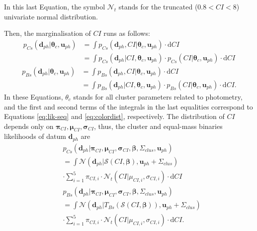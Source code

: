 In this last Equation, the symbol $\mathcal{N}_t$ stands for the truncated ($0.8<CI<8$) univariate normal distribution.

Then, the marginalisation of $CI$ runs as follows:
\begin{align}
\label{eq:clmarginalps}
 p_{Cs}(\mathbf{d}_{ph}| \boldsymbol{\theta}_c,\mathbf{u}_{ph})&=\int p_{Cs}(\mathbf{d}_{ph},CI| \boldsymbol{\theta}_c,\mathbf{u}_{ph}) \cdot \mathrm{d}CI \nonumber \\
 &=\int p_{Cs}(\mathbf{d}_{ph}|CI, \boldsymbol{\theta}_c,\mathbf{u}_{ph}) \cdot p_{Cs}(CI| \boldsymbol{\theta}_c,\mathbf{u}_{ph})\cdot \mathrm{d}CI 
\end{align}
\begin{align}
\label{eq:clmarginalpb}
p_{Bs}(\mathbf{d}_{ph}| \boldsymbol{\theta}_c,\mathbf{u}_{ph})&=\int p_{Bs}(\mathbf{d}_{ph},CI| \boldsymbol{\theta}_c,\mathbf{u}_{ph})\cdot \mathrm{d}CI \nonumber \\
 &=\int p_{Bs}(\mathbf{d}_{ph}|CI, \boldsymbol{\theta}_c,\mathbf{u}_{ph})\cdot p_{Bs}(CI| \boldsymbol{\theta}_c,\mathbf{u}_{ph})\cdot \mathrm{d}CI.
\end{align}
In these Equations, $\theta_c$ stands for all cluster parameters related to photometry, and the first and second terms of the integrals in the last equalities correspond to Equations \ref{eq:lik-seq} and \ref{eq:colordist}, respectively. The distribution of $CI$ depends only on $\boldsymbol{\pi}_{CI},\boldsymbol{\mu}_{CI},\boldsymbol{\sigma}_{CI}$, thus, the cluster and equal-mass binaries likelihoods of datum $\mathbf{d}_{ph}$ are 
\begin{align}
\label{eq:lik-seq2}
 &p_{Cs}(\mathbf{d}_{ph}|\boldsymbol{\pi}_{CI},\boldsymbol{\mu}_{CI},\boldsymbol{\sigma}_{CI},\boldsymbol{\beta},\Sigma_{clus},\mathbf{u}_{ph}) \nonumber \\
 &=\int{\mathcal{N}}(\mathbf{d}_{ph}|\boldsymbol{\mathcal{S}}(CI, \boldsymbol{\beta}), \mathbf{u}_{ph}+\Sigma_{clus}) \nonumber \\
 &\cdot \sum_{i=1}^5 \pi_{CI,i}\cdot \mathcal{N}_t(CI| \mu_{CI,i},\sigma_{CI,i}) \cdot \mathrm{d}CI\nonumber \\
&p_{Bs}(\mathbf{d}_{ph}|\boldsymbol{\pi}_{CI},\boldsymbol{\mu}_{CI},\boldsymbol{\sigma}_{CI}, \boldsymbol{\beta},\Sigma_{clus}, \mathbf{u}_{ph})\nonumber \\
&=\int{\mathcal{N}}(\mathbf{d}_{ph}|T_{Bs}( \boldsymbol{\mathcal{S}}(CI, \boldsymbol{\beta})), \mathbf{u}_{ph}+\Sigma_{clus}) \nonumber \\ &\cdot \sum_{i=1}^5 \pi_{CI,i}\cdot \mathcal{N}_t(CI| \mu_{CI,i},\sigma_{CI,i}) \cdot \mathrm{d}CI.
\end{align}

